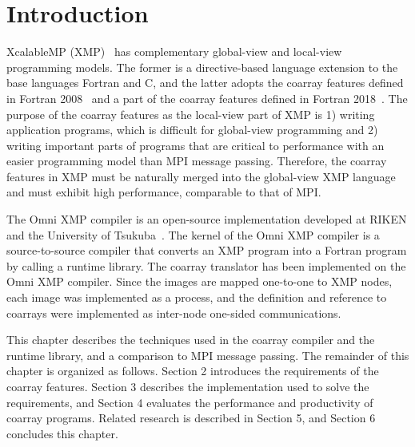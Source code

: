 ﻿\section{Introduction}\label{chap:intro}

\setcounter{page}{1}

XcalableMP (XMP)~\cite{xmp} has complementary global-view and local-view programming models. The former is a directive-based language 
extension to the base languages Fortran and C, and the latter adopts 
the coarray features defined in Fortran 2008~\cite{coarray} and 
a part of the coarray features defined in Fortran 2018~\cite{coarray18}. 
%
The purpose of the coarray features as the local-view part of XMP is 
1) writing application programs, which is difficult for global-view programming
and 2) writing important parts of programs that are critical to performance
with an easier programming model than MPI message passing.
Therefore, the coarray features in XMP must be naturally merged into the 
global-view XMP language and must exhibit high performance, comparable to that of MPI.

The Omni XMP compiler is an open-source implementation developed at RIKEN 
and the University of Tsukuba~\cite{omni}. 
The kernel of the Omni XMP compiler is a source-to-source compiler that converts an XMP program into a Fortran program by calling a runtime library.
%
The coarray translator has been implemented on the Omni XMP compiler.
Since the images are mapped one-to-one to XMP nodes, 
each image was implemented as a process, and the definition and reference to coarrays were implemented as inter-node one-sided communications.

This chapter describes the techniques used in the coarray compiler and 
the runtime library, and a comparison to MPI message passing.
The remainder of this chapter is organized as follows. 
Section 2 introduces the requirements of the coarray features.
Section 3 describes the implementation used to solve the requirements, and
Section 4 evaluates the performance and productivity of coarray programs.
Related research is described in Section 5, and Section 6 concludes this chapter.





